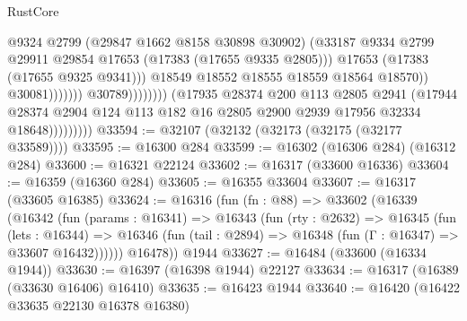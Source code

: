 \begin{lexlean}{RustCore}
\begin{coremodule}
                                                      @9324
                                                      @2799
                                                      (@29847 @1662 @8158 @30898 @30902)
                                                      (@33187
                                                        @9334
                                                        @2799
                                                        @29911
                                                        @29854
                                                        @17653
                                                        (@17383 (@17655 @9335 @2805)))
                                                      @17653
                                                      (@17383 (@17655 @9325 @9341)))
                                                    @18549
                                                    @18552
                                                    @18555
                                                    @18559
                                                    @18564
                                                    @18570))
                                                @30081)))))))
                                  @30789))))))))
                  (@17935
                    @28374
                    @200
                    @113
                    @2805
                    @2941
                    (@17944
                      @28374
                      @2904
                      @124
                      @113
                      @182
                      @16
                      @2805
                      @2900
                      @2939
                      @17956
                      @32334
                      @18648)))))))))
@33594 := @32107 (@32132 (@32173 (@32175 (@32177 @33589))))
@33595 := @16300 @284
@33599 := @16302 (@16306 @284) (@16312 @284)
@33600 := @16321 @22124
@33602 := @16317 (@33600 @16336)
@33604 := @16359 (@16360 @284)
@33605 := @16355 @33604
@33607 := @16317 (@33605 @16385)
@33624 := @16316
    (fun (fn : @88) =>
    @33602
      (@16339
        (@16342
          (fun (params : @16341) =>
          @16343
            (fun (rty : @2632) =>
            @16345
              (fun (lets : @16344) =>
              @16346 (fun (tail : @2894) => @16348 (fun (Γ : @16347) => @33607 @16432))))))
        @16478))
    @1944
@33627 := @16484 (@33600 (@16334 @1944))
@33630 := @16397 (@16398 @1944) @22127
@33634 := @16317 (@16389 (@33630 @16406) @16410)
@33635 := @16423 @1944
@33640 := @16420 (@16422 @33635 @22130 @16378 @16380)

\end{coremodule}
\end{lexlean}
